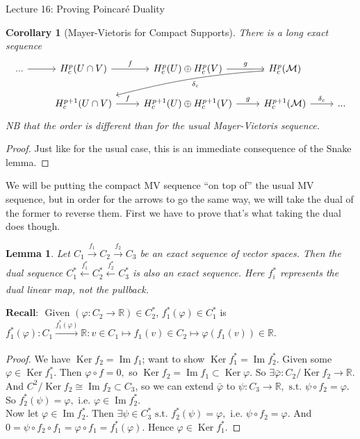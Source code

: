 \documentclass[10pt]{article}
\theoremstyle{plain}
\newtheorem{corollary}[thm]{Corollary}
\newtheorem{lemma}[thm]{Lemma}
\theoremstyle{definition}
\newcommand{\st}{\text{ s.t. }}
\newcommand{\ie}{\text{ i.e. }}
\newcommand{\Recall}{\textbf{Recall: }}
\newcommand{\Real}{\mathbb{R}}
\DeclareMathOperator{\Ker}{Ker}
\DeclareMathOperator{\Ima}{Im}
\newcommand{\UintV}{U\cap V}
\begin{document}
\begin{section}{Lecture 16: Proving Poincar\'e Duality}
\begin{corollary}[Mayer-Vietoris for Compact Supports]\label{cor:CompactMVT}
There is a long exact sequence
$$\begin{tikzcd}
... \arrow[r] & H_c^p(\UintV) \arrow[r, "f"]     & H_c^p(U)\oplus H_c^p(V) \arrow[r, "g"]         & H_c^p(\mathcal{M}) \arrow[lld, "\delta_c",bend right = 5] &     \\
              & H_c^{p+1}(\UintV) \arrow[r, "f"] & H_c^{p+1}(U)\oplus H_c^{p+1}(V) \arrow[r, "g"] & H_c^{p+1}(\mathcal{M}) \arrow[r, "\delta_c"]                          & ...
\end{tikzcd}$$
NB that the order is different than for the usual Mayer-Vietoris sequence.
\end{corollary}
\begin{proof}
Just like for the usual case, this is an immediate consequence of the Snake lemma.
\end{proof}
We will be putting the compact MV sequence ``on top of'' the usual MV sequence, but in order for the arrows to go the same way, we will take the dual of the former to reverse them. First we have to prove that's what taking the dual does though.
\begin{lemma}
Let $C_1 \xrightarrow{f_1} C_2 \xrightarrow{f_2} C_3$ be an exact sequence of vector spaces. Then the dual sequence $C_1^* \xleftarrow[]{f_1^*} C_2^* \xleftarrow[]{f_2^*} C_3^*$ is also an exact sequence. Here $f_i^*$ represents the dual linear map, not the pullback.
\end{lemma}

\noindent
$\Recall$ Given $(\varphi : C_2 \to \Real ) \in C_2^*$, $f_1^*( \varphi)\in C_1^*$ is $f_1^*(\varphi) : C_1 \xrightarrow[]{f_1^*(\varphi)} \Real: v\in C_1 \mapsto f_1(v) \in C_2 \mapsto \varphi(f_1(v))\in \Real$.

\begin{proof}
We have $\Ker f_2 = \Ima f_1$; want to show $\Ker f_1^* = \Ima f_2^*$. Given some $\varphi \in \Ker f_1^*$. Then $\varphi \circ f = 0,$ so $\Ker f_2 = \Ima f_1 \subset \Ker \varphi$. So $\exists \bar{\varphi} : C_2 / \Ker f_2 \to \Real$. And $C^2 /\Ker f_2 \cong \Ima f_2 \subset C_3$, so we can extend $\bar{\varphi} $ to $\psi : C_3 \to \Real, \st \psi \circ f_2 = \varphi$. So $f_2^*(\psi) = \varphi, \ie \varphi \in \Ima f_2^*.$\\
Now let $\varphi \in \Ima f_2^*.$ Then $\exists \psi \in C_3^* \st f_2^*(\psi) = \varphi, \ie \psi \circ f_2 = \varphi.$ And $0 = \psi \circ f_2 \circ f_1 = \varphi \circ f_1 = f_1^*(\varphi).$ Hence $\varphi \in \Ker f_1^*$.
\end{proof}



\end{section}
\end{document}
